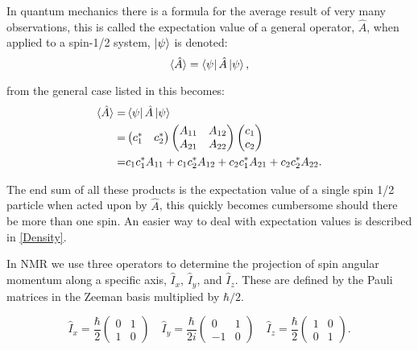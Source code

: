 In quantum mechanics there is a formula for the average result of very many observations, this is
called the expectation value of a general operator, $\hat{A}$, when applied to a spin-1/2 system, $\ket{\psi}$
is denoted:
\begin{equation}
  \langle\hat{A}\rangle = \bra{\psi}\hat{A}\ket{\psi},
\end{equation}

from the general case listed in  this becomes:
\begin{align}\label{eqn:expectation}
  \langle\hat{A}\rangle =& \bra{\psi}\hat{A}\ket{\psi}\\
  =& \begin{pmatrix}
    c_1^* & c_2^*
\end{pmatrix}
\begin{pmatrix}
A_{11} & A_{12}\\
A_{21} & A_{22}
\end{pmatrix}
\begin{pmatrix}
  c_1\\
  c_2
\end{pmatrix}\\
=& c_1c_1^*A_{11} + c_1c_2^*A_{12} + c_2c_1^*A_{21} + c_2c_2^*A_{22}.
\end{align}

The end sum of all these products is the expectation value of a single spin 1/2 particle when
acted upon by $\hat{A}$, this quickly becomes cumbersome should there be more than one spin. An easier
way to deal with expectation values is described in \ref{Density}.

In NMR we use three operators to determine the projection of spin angular momentum along a
specific axis, $\hat{I}_x$, $\hat{I}_y$, and $\hat{I}_z$. These are defined by the
Pauli matrices in the Zeeman basis multiplied by $\hbar/2$.

\begin{equation}
  \hat{I}_x=\frac{\hbar}{2}\begin{pmatrix}
    0 & 1\\
    1 & 0
\end{pmatrix}\quad
\hat{I}_y=\frac{\hbar}{2i}\begin{pmatrix}
  0 & 1\\
  -1 & 0
\end{pmatrix}\quad
\hat{I}_z=\frac{\hbar}{2}\begin{pmatrix}
  1 & 0\\
  0 & 1
\end{pmatrix}.
\end{equation}

